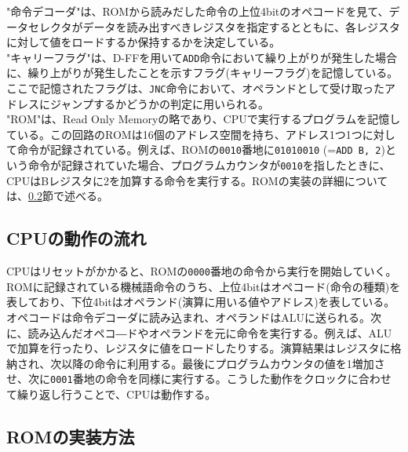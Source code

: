 \documentclass[dvipdfmx,a4j, titlepage]{jsarticle}
\begin{document}
"命令デコーダ"は、ROMから読みだした命令の上位4bitのオペコードを見て、データセレクタがデータを読み出すべきレジスタを指定するとともに、各レジスタに対して値をロードするか保持するかを決定している。\\

"キャリーフラグ"は、D-FFを用いて\verb|ADD|命令において繰り上がりが発生した場合に、繰り上がりが発生したことを示すフラグ(キャリーフラグ)を記憶している。ここで記憶されたフラグは、\verb|JNC|命令において、オペランドとして受け取ったアドレスにジャンプするかどうかの判定に用いられる。\\

"ROM"は、Read Only Memoryの略であり、CPUで実行するプログラムを記憶している。この回路のROMは16個のアドレス空間を持ち、アドレス1つ1つに対して命令が記録されている。例えば、ROMの\verb|0010|番地に\verb|01010010| (=\verb|ADD B, 2|)という命令が記録されていた場合、プログラムカウンタが\verb|0010|を指したときに、CPUはBレジスタに2を加算する命令を実行する。ROMの実装の詳細については、\ref{implemtnt_rom}節で述べる。\\

\subsection{CPUの動作の流れ}
CPUはリセットがかかると、ROMの\verb|0000|番地の命令から実行を開始していく。ROMに記録されている機械語命令のうち、上位4bitはオペコード(命令の種類)を表しており、下位4bitはオペランド(演算に用いる値やアドレス)を表している。オペコードは命令デコーダに読み込まれ、オペランドはALUに送られる。次に、読み込んだオペコ―ドやオペランドを元に命令を実行する。例えば、ALUで加算を行ったり、レジスタに値をロードしたりする。演算結果はレジスタに格納され、次以降の命令に利用する。最後にプログラムカウンタの値を1増加させ、次に\verb|0001|番地の命令を同様に実行する。こうした動作をクロックに合わせて繰り返し行うことで、CPUは動作する。

\subsection{ROMの実装方法}\label{implemtnt_rom}
\end{document}
